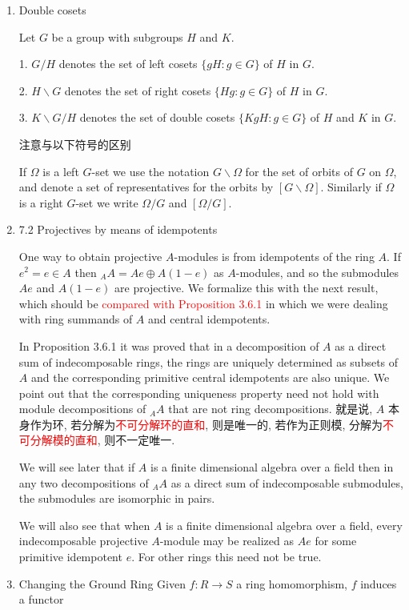 \documentclass[UTF8]{ctexart}
\begin{document}
\begin{enumerate}
\item Double cosets

Let $G$ be a group with subgroups $H$ and $K$.

1. $G/H$ denotes the set of left cosets $\{gH : g \in G\}$ of $H$ in $G$.

2. $H\backslash G$ denotes the set of right cosets $\{Hg : g \in G\}$ of $H$ in $G$.

3. $K\backslash G/H$ denotes the set of double cosets $\{KgH : g \in G\}$ of $H$ and $K$ in $G$.

注意与以下符号的区别

If $\Omega$ is a left $G$-set we use the notation $G\backslash \Omega$ for the set of orbits of $G$ on $\Omega$, and denote a set of representatives for the orbits by $[G\backslash \Omega]$. Similarly if $\Omega$ is a right $G$-set we write $\Omega /G$ and $[\Omega/G]$.

\item 7.2 Projectives by means of idempotents

One way to obtain projective $A$-modules is from idempotents of the ring $A$. If $e^2 = e \in A$ then ${}_AA = Ae \oplus A(1 - e)$ as $A$-modules, and so the submodules $Ae$ and $A(1 - e)$ are projective. We formalize this with the next result, which should be \textcolor{red}{compared with Proposition 3.6.1} in which we were dealing with ring summands of $A$ and central idempotents.

In Proposition 3.6.1 it was proved that in a decomposition of $A$ as a direct sum of indecomposable rings, the rings are uniquely determined as subsets of $A$ and the corresponding primitive central idempotents are also unique. We point out that the corresponding uniqueness property need not hold with module decompositions of ${}_AA$ that are not ring decompositions. 就是说, $A$ 本身作为环, 若分解为\textcolor{red}{不可分解环的直和}, 则是唯一的, 若作为正则模, 分解为\textcolor{red}{不可分解模的直和}, 则不一定唯一.

We will see later that if $A$ is a finite dimensional algebra over a field then in any two decompositions of ${}_AA$ as a direct sum of indecomposable submodules, the submodules are isomorphic in pairs.

We will also see that when $A$ is a finite dimensional algebra over a field, every indecomposable projective $A$-module may be realized as $Ae$ for some primitive idempotent $e$. For other rings this need not be true.

\item Changing the Ground Ring
Given $f : R \to S$ a ring homomorphism, $f$ induces a functor


\end{enumerate}
\end{document}
